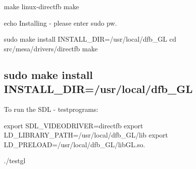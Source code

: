 make linux-\/directfb make

echo Installing -\/ please enter sudo pw.

sudo make install I\+N\+S\+T\+A\+L\+L\+\_\+\+D\+IR=/usr/local/dfb\+\_\+\+GL cd src/mesa/drivers/directfb make \subsection*{sudo make install I\+N\+S\+T\+A\+L\+L\+\_\+\+D\+IR=/usr/local/dfb\+\_\+\+GL }

To run the S\+DL -\/ testprograms\+:

export S\+D\+L\+\_\+\+V\+I\+D\+E\+O\+D\+R\+I\+V\+ER=directfb export L\+D\+\_\+\+L\+I\+B\+R\+A\+R\+Y\+\_\+\+P\+A\+TH=/usr/local/dfb\+\_\+\+G\+L/lib export L\+D\+\_\+\+P\+R\+E\+L\+O\+AD=/usr/local/dfb\+\_\+\+G\+L/lib\+GL.so.

./testgl 